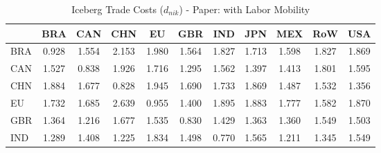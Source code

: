 \begin{table}[htbp]
\centering
\caption{Iceberg Trade Costs ($d_{nik}$) - Paper: with Labor Mobility} 
\label{tab:iceberg_Paper}
\begin{tabular}{lcccccccccc}
  \hline
 & BRA & CAN & CHN & EU & GBR & IND & JPN & MEX & RoW & USA \\ 
  \hline
BRA & \textcolor[RGB]{235,152,20}{0.928} & \textcolor[RGB]{133,86,122}{1.554} & \textcolor[RGB]{8,5,247}{2.153} & \textcolor[RGB]{13,8,242}{1.980} & \textcolor[RGB]{128,82,128}{1.564} & \textcolor[RGB]{43,28,212}{1.827} & \textcolor[RGB]{69,45,186}{1.713} & \textcolor[RGB]{110,71,145}{1.598} & \textcolor[RGB]{46,30,209}{1.827} & \textcolor[RGB]{36,23,219}{1.869} \\ 
  CAN & \textcolor[RGB]{145,94,110}{1.527} & \textcolor[RGB]{242,157,13}{0.838} & \textcolor[RGB]{18,12,237}{1.926} & \textcolor[RGB]{66,43,189}{1.716} & \textcolor[RGB]{217,140,38}{1.295} & \textcolor[RGB]{130,84,125}{1.562} & \textcolor[RGB]{194,125,61}{1.397} & \textcolor[RGB]{178,115,76}{1.413} & \textcolor[RGB]{51,33,204}{1.801} & \textcolor[RGB]{115,74,140}{1.595} \\ 
  CHN & \textcolor[RGB]{25,16,230}{1.884} & \textcolor[RGB]{84,54,171}{1.677} & \textcolor[RGB]{247,160,8}{0.828} & \textcolor[RGB]{15,10,240}{1.945} & \textcolor[RGB]{71,46,184}{1.690} & \textcolor[RGB]{59,38,196}{1.733} & \textcolor[RGB]{33,21,222}{1.869} & \textcolor[RGB]{163,106,92}{1.487} & \textcolor[RGB]{143,92,112}{1.532} & \textcolor[RGB]{207,134,48}{1.356} \\ 
  EU & \textcolor[RGB]{64,41,191}{1.732} & \textcolor[RGB]{74,48,181}{1.685} & \textcolor[RGB]{0,0,255}{2.639} & \textcolor[RGB]{232,150,23}{0.955} & \textcolor[RGB]{191,124,64}{1.400} & \textcolor[RGB]{23,15,232}{1.895} & \textcolor[RGB]{28,18,227}{1.883} & \textcolor[RGB]{54,35,201}{1.777} & \textcolor[RGB]{120,78,135}{1.582} & \textcolor[RGB]{31,20,224}{1.870} \\ 
  GBR & \textcolor[RGB]{199,129,56}{1.364} & \textcolor[RGB]{224,145,31}{1.216} & \textcolor[RGB]{87,56,168}{1.677} & \textcolor[RGB]{140,91,115}{1.535} & \textcolor[RGB]{245,158,10}{0.830} & \textcolor[RGB]{176,114,79}{1.429} & \textcolor[RGB]{201,130,54}{1.363} & \textcolor[RGB]{204,132,51}{1.360} & \textcolor[RGB]{135,87,120}{1.549} & \textcolor[RGB]{153,99,102}{1.503} \\ 
  IND & \textcolor[RGB]{219,142,36}{1.289} & \textcolor[RGB]{184,119,71}{1.408} & \textcolor[RGB]{222,144,33}{1.225} & \textcolor[RGB]{41,26,214}{1.834} & \textcolor[RGB]{158,102,97}{1.498} & \textcolor[RGB]{252,163,3}{0.770} & \textcolor[RGB]{125,81,130}{1.565} & \textcolor[RGB]{227,147,28}{1.211} & \textcolor[RGB]{212,137,43}{1.345} & \textcolor[RGB]{138,89,117}{1.549} \\ 

\end{tabular}
\end{table}
